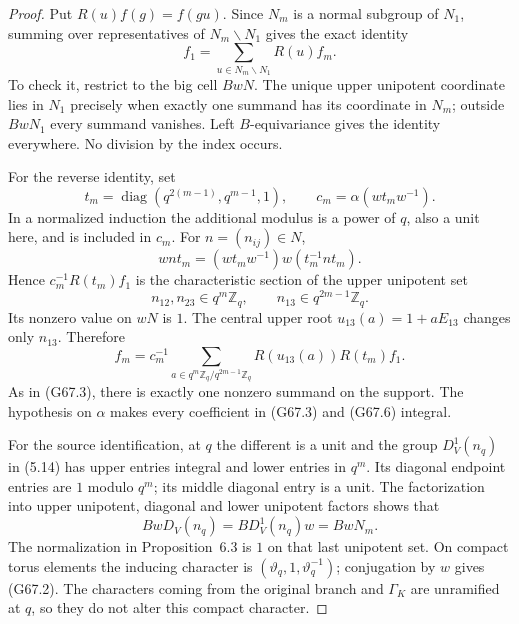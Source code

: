 \begin{proof}
Put $R(u)f(g)=f(gu)$.  Since $N_m$ is a normal subgroup of
$N_1$, summing over representatives of $N_m\backslash N_1$
gives the exact identity
\[
             f_1=\sum_{u\in N_m\backslash N_1}R(u)f_m.
                                                        \tag{G67.3}
\]
To check it, restrict to the big cell $BwN$.  The unique
upper unipotent coordinate lies in $N_1$ precisely when
exactly one summand has its coordinate in $N_m$; outside
$BwN_1$ every summand vanishes.  Left $B$-equivariance gives
the identity everywhere.  No division by the index occurs.

For the reverse identity, set
\[
 t_m=\operatorname{diag}(q^{2(m-1)},q^{m-1},1),\qquad
 c_m=\alpha(wt_mw^{-1}).                                \tag{G67.4}
\]
In a normalized induction the additional modulus is a power
of $q$, also a unit here, and is included in $c_m$.
For $n=(n_{ij})\in N$,
\[
 wnt_m=(wt_mw^{-1})w(t_m^{-1}nt_m).
\]
Hence $c_m^{-1}R(t_m)f_1$ is the characteristic section of
the upper unipotent set
\[
 n_{12},n_{23}\in q^m\mathbb Z_q,\qquad
 n_{13}\in q^{2m-1}\mathbb Z_q.                         \tag{G67.5}
\]
Its nonzero value on $wN$ is $1$.  The central upper root
$u_{13}(a)=1+aE_{13}$ changes only $n_{13}$.  Therefore
\[
 f_m=c_m^{-1}
       \sum_{a\in q^m\mathbb Z_q/q^{2m-1}\mathbb Z_q}
                   R(u_{13}(a))R(t_m)f_1.                 \tag{G67.6}
\]
As in (G67.3), there is exactly one nonzero summand on the
support.  The hypothesis on $\alpha$ makes every coefficient
in (G67.3) and (G67.6) integral.

For the source identification, at $q$ the different is a
unit and the group $D_V^1(n_q)$ in (5.14) has upper entries
integral and lower entries in $q^m$.  Its diagonal endpoint
entries are $1$ modulo $q^m$; its middle diagonal entry is a
unit.  The factorization into upper unipotent, diagonal and
lower unipotent factors shows that
\[
     B w D_V(n_q)=B D_V^1(n_q) w=B w N_m.
\]
The normalization in Proposition~6.3 is $1$ on that last
unipotent set.  On compact torus elements the inducing
character is $(\vartheta_q,1,\vartheta_q^{-1})$; conjugation
by $w$ gives (G67.2).  The characters coming from the
original branch and $\Gamma_K$ are unramified at $q$, so they
do not alter this compact character.


\end{proof}
